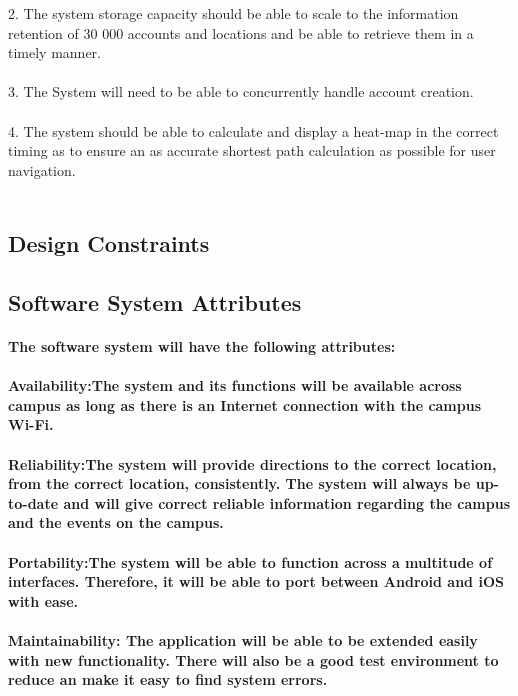 \documentclass{article}
\begin{document}
{2.	The system storage capacity should be able to scale to the information retention of 30 000 accounts and locations and be able to retrieve them in a timely manner.\\\\
3.	The System will need to be able to concurrently handle account creation.\\\\
4.	The system should be able to calculate and display a heat-map in the correct timing as to ensure an as accurate shortest path calculation as possible for user navigation.\\\\

	}
        \subsection{Design Constraints}
        \subsection{Software System Attributes}
		\paragraph{		
			The software system will have the following attributes:
} 

		\paragraph{Availability:The system and its functions will be available across campus as long as there is an Internet connection with the campus Wi-Fi. 
}
		\paragraph{Reliability:The system will provide directions to the correct location, from the correct location, consistently. The system will always be up-to-date and will give correct reliable information regarding the campus and the events on the campus.
}
		\paragraph{Portability:The system will be able to function across a multitude of interfaces. Therefore, it will be able to port between Android and iOS with ease. 
}
		\paragraph{Maintainability: The application will be able to be extended easily with new functionality. There will also be a good test environment to reduce an make it easy to find system errors.  }
\end{document}

